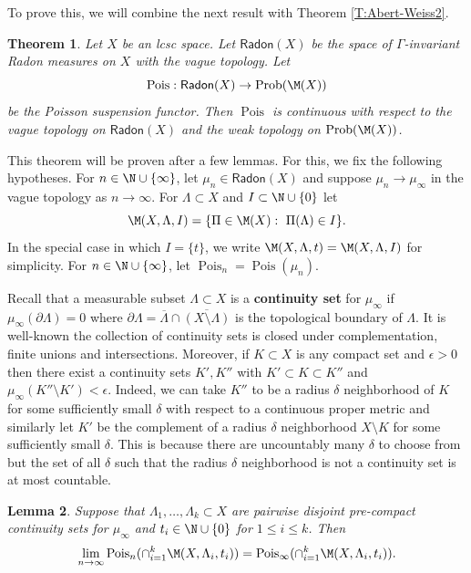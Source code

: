 \documentclass[12pt]{article}
\theoremstyle{plain}
\newtheorem{thm}{Theorem}[section]
\newtheorem{lem}[thm]{Lemma}
\theoremstyle{definition}
\theoremstyle{remark}
\newcommand{\G}{\Gamma}
\newcommand{\eps}{\epsilon}
\newcommand\Pois{\operatorname{Pois}}
\newcommand\Prob{\operatorname{Prob}}
\newcommand\Radon{\mathsf{Radon}}
\begin{document}
To prove this, we will combine the next result with Theorem \ref{T:Abert-Weiss2}.

\begin{thm}\label{T:Pois-continuity}
    Let $X$ be an lcsc space. 
    Let $\Radon(X)$ be the space of $\G$-invariant Radon measures on $X$ with the vague topology. Let
    $$\Pois:\Radon(X)  \to \Prob(\M(X))$$
    be the Poisson suspension functor. Then $\Pois$ is continuous with respect to the vague topology on $\Radon(X)$ and the weak topology on $\Prob(\M(X))$.
\end{thm}
This theorem will be proven after a few lemmas. For this,  we fix the following hypotheses. For $n\in \N \cup \{\infty\}$, let $\mu_n \in \Radon(X)$ and suppose $\mu_n \to \mu_\infty$ in the vague topology as $n\to\infty$. For $\Lambda \subset X$ and $I \subset \N \cup \{0\}$ let 
$$\M(X,\Lambda,I)=\{\Pi \in \M(X):~ \Pi(\Lambda)\in I\}.$$
In the special case in which $I=\{t\}$, we write $\M(X,\Lambda,t)=\M(X,\Lambda,I)$ for simplicity. For $n\in\N\cup\{\infty\}$, let $\Pois_n=\Pois(\mu_n)$.

   Recall that a measurable subset $\Lambda \subset X$ is a {\bf continuity set} for $\mu_\infty$ if $\mu_\infty(\partial \Lambda)=0$ where $\partial \Lambda = \overline{\Lambda} \cap \overline{(X \setminus \Lambda)}$ is the topological boundary of $\Lambda$. It is well-known the collection of continuity sets is closed under complementation, finite unions and intersections. Moreover, if $K \subset X$ is any compact set and $\eps>0$ then there exist a continuity sets $K',K''$ with $K' \subset K \subset K''$ and $\mu_\infty(K''\setminus K')<\eps$. Indeed, we can take $K''$ to be a radius $\delta$ neighborhood of $K$ for some sufficiently small $\delta$ with respect to a continuous proper metric and similarly let $K'$ be the complement of a radius $\delta$ neighborhood $X \setminus K$ for some sufficiently small $\delta$. This is because there are uncountably many $\delta$ to choose from but the set of all $\delta$ such that the radius $\delta$ neighborhood is not a continuity set is at most countable. 
   
\begin{lem}\label{L:continuityset}
 Suppose that $\Lambda_1,\ldots, \Lambda_k \subset X$ are pairwise disjoint pre-compact continuity sets for $\mu_\infty$ and $t_i \in \N \cup \{0\}$ for $1\le i \le k$. Then
 $$\lim_{n\to\infty} \Pois_n(\cap_{i=1}^k \M(X,\Lambda_i, t_i)) =  \Pois_\infty(\cap_{i=1}^k \M(X,\Lambda_i, t_i)).$$
\end{lem}
\end{document}
